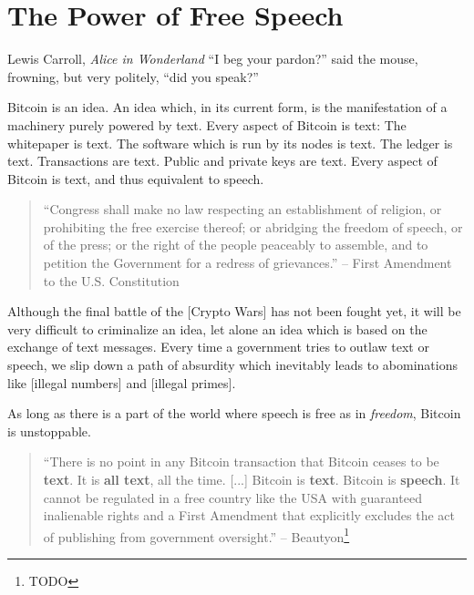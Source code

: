 \chapter{The Power of Free Speech}
\label{les:6}

\begin{chapquote}{Lewis Carroll, \textit{Alice in Wonderland}}
``I beg your pardon?'' said the mouse, frowning, but very politely, ``did you speak?''
\end{chapquote}

Bitcoin is an idea. An idea which, in its current form, is the
manifestation of a machinery purely powered by text. Every aspect of
Bitcoin is text: The whitepaper is text. The software which is run by
its nodes is text. The ledger is text. Transactions are text. Public and
private keys are text. Every aspect of Bitcoin is text, and thus
equivalent to speech.

\begin{quotation}
``Congress shall make no law respecting an establishment of religion,
or prohibiting the free exercise thereof; or abridging the freedom of
speech, or of the press; or the right of the people peaceably to
assemble, and to petition the Government for a redress of grievances.''
\flushright -- First Amendment to the U.S. Constitution
\end{quotation}

Although the final battle of the [Crypto Wars] has not been fought yet,
it will be very difficult to criminalize an idea, let alone an idea
which is based on the exchange of text messages. Every time a government
tries to outlaw text or speech, we slip down a path of absurdity which
inevitably leads to abominations like [illegal numbers] and [illegal
primes].

As long as there is a part of the world where speech is free as in
\textit{freedom}, Bitcoin is unstoppable.

\begin{quotation}
``There is no point in any Bitcoin transaction that Bitcoin ceases to be
\textbf{text}. It is \textbf{all text}, all the time. [...] Bitcoin is
\textbf{text}. Bitcoin is \textbf{speech}. It cannot be regulated in a free
country like the USA with guaranteed inalienable rights and a First Amendment
that explicitly excludes the act of publishing from government oversight.''
\flushright -- Beautyon\footnote{TODO} %
\end{quotation}

